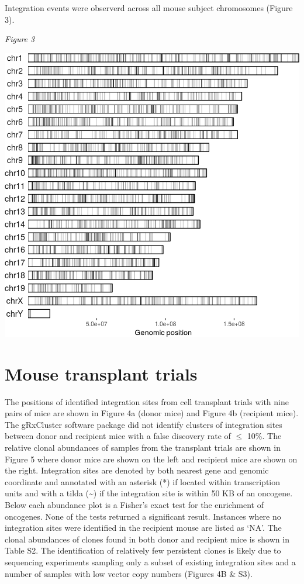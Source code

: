 \documentclass[12pt,]{article}
\begin{document}
Integration events were observerd across all mouse subject chromosomes
(Figure 3).

\vspace{1.0cm}

\emph{Figure 3}

\vspace{0.25cm}

\includegraphics{project.group2_files/figure-latex/fig3a-1.png}

\newpage

\section{Mouse transplant trials}\label{mouse-transplant-trials}

The positions of identified integration sites from cell transplant
trials with nine pairs of mice are shown in Figure 4a (donor mice) and
Figure 4b (recipient mice). The gRxCluster software package did not
identify clusters of integration sites between donor and recipient mice
with a false discovery rate of \(\leq\) 10\%. The relative clonal
abundances of samples from the transplant trials are shown in Figure 5
where donor mice are shown on the left and recipient mice are shown on
the right. Integration sites are denoted by both nearest gene and
genomic coordinate and annotated with an asterisk (*) if located within
transcription units and with a tilda (\textasciitilde{}) if the
integration site is within 50 KB of an oncogene. Below each abundance
plot is a Fisher's exact test for the enrichment of oncogenes. None of
the tests returned a significant result. Instances where no integration
sites were identified in the recipient mouse are listed as `NA'. The
clonal abundances of clones found in both donor and recipient mice is
shown in Table S2. The identification of relatively few persistent
clones is likely due to sequencing experiments sampling only a subset of
existing integration sites and a number of samples with low vector copy
numbers (Figures 4B \& S3).
\end{document}
